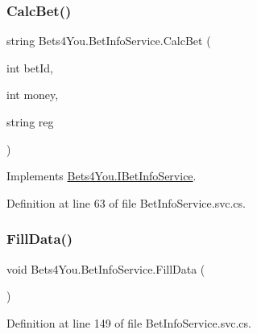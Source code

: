 \mbox{\label{class_bets4_you_1_1_bet_info_service_aedba79801c5395db599f761241964617}} 
\subsubsection{\texorpdfstring{CalcBet()}{CalcBet()}}
{\footnotesize\ttfamily string Bets4\+You.\+Bet\+Info\+Service.\+Calc\+Bet (\begin{DoxyParamCaption}\item[{int}]{bet\+Id,  }\item[{int}]{money,  }\item[{string}]{reg }\end{DoxyParamCaption})}



Implements \mbox{\hyperlink{interface_bets4_you_1_1_i_bet_info_service_a79929162b26a32f83ceac33c5930197f}{Bets4\+You.\+I\+Bet\+Info\+Service}}.



Definition at line 63 of file Bet\+Info\+Service.\+svc.\+cs.

\mbox{\label{class_bets4_you_1_1_bet_info_service_abdb26d3de0f10a237d7bebec509e9e1e}} 
\subsubsection{\texorpdfstring{FillData()}{FillData()}}
{\footnotesize\ttfamily void Bets4\+You.\+Bet\+Info\+Service.\+Fill\+Data (\begin{DoxyParamCaption}{ }\end{DoxyParamCaption})}



Definition at line 149 of file Bet\+Info\+Service.\+svc.\+cs.

\mbox{\label{class_bets4_you_1_1_bet_info_service_a79ead73bbe8e74034d5002f4d64ced32}} 
